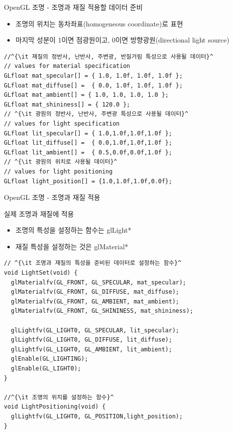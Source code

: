 \documentclass{beamer}
\begin{document}
\begin{frame}[fragile]{OpenGL 조명 - 조명과 재질 적용할 데이터 준비}

\begin{itemize}
\item 조명의 위치는 동차좌표(homogeneous coordinate)로 표현
\item 마지막 성분이 1이면 점광원이고, 0이면 방향광원(directional light source)
\end{itemize}

\lstset{language=C++, escapechar=^} 
\begin{lstlisting}
//^{\it 재질의 정반사, 난반사, 주변광, 반질거림 특성으로 사용될 데이터}^
// values for material specification
GLfloat mat_specular[] = { 1.0, 1.0f, 1.0f, 1.0f };
GLfloat mat_diffuse[] =  { 0.0, 1.0f, 1.0f, 1.0f };
GLfloat mat_ambient[] = { 1.0, 1.0, 1.0, 1.0 };
GLfloat mat_shininess[] = { 120.0 };
// ^{\it 광원의 정반사, 난반사, 주변광 특성으로 사용될 데이터}^
// values for light specification
GLfloat lit_specular[] = { 1.0,1.0f,1.0f,1.0f };
GLfloat lit_diffuse[] =  { 0.0,1.0f,1.0f,1.0f };
GLfloat lit_ambient[] =  { 0.5,0.0f,0.0f,1.0f };
// ^{\it 광원의 위치로 사용될 데이터}^
// values for light positioning
GLfloat light_position[] = {1.0,1.0f,1.0f,0.0f};

\end{lstlisting}


\end{frame}


\begin{frame}[fragile]{OpenGL 조명 - 조명과 재질 적용}


실제 조명과 재질에 적용
\begin{itemize}
\item 조명의 특성을 설정하는 함수는 {\sf glLight*}
\item 재질 특성을 설정하는 것은 {\sf glMaterial*}
\end{itemize}

\lstset{language=C++, escapechar=^} 
\begin{lstlisting}
// ^{\it 조명과 재질의 특성을 준비된 데이터로 설정하는 함수}^
void LightSet(void) {
  glMaterialfv(GL_FRONT, GL_SPECULAR, mat_specular);
  glMaterialfv(GL_FRONT, GL_DIFFUSE, mat_diffuse);
  glMaterialfv(GL_FRONT, GL_AMBIENT, mat_ambient);
  glMaterialfv(GL_FRONT, GL_SHININESS, mat_shininess);

  glLightfv(GL_LIGHT0, GL_SPECULAR, lit_specular);
  glLightfv(GL_LIGHT0, GL_DIFFUSE, lit_diffuse);
  glLightfv(GL_LIGHT0, GL_AMBIENT, lit_ambient);
  glEnable(GL_LIGHTING);
  glEnable(GL_LIGHT0);
}

//^{\it 조명의 위치를 설정하는 함수}^
void LightPositioning(void) {
  glLightfv(GL_LIGHT0, GL_POSITION,light_position);
}
\end{lstlisting}


\end{frame}
\end{document}
